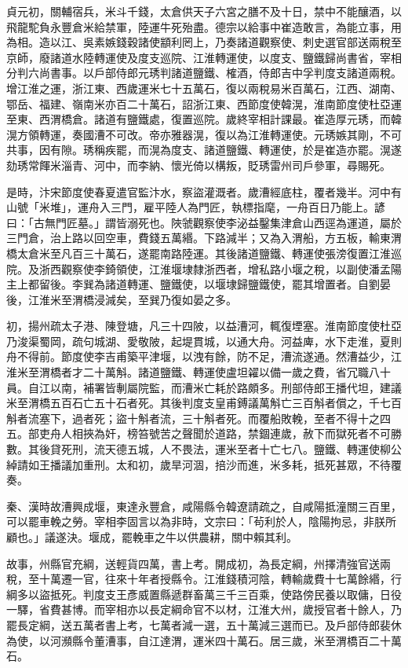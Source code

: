 \begin{pinyinscope}
 貞元初，關輔宿兵，米斗千錢，太倉供天子六宮之膳不及十日，禁中不能釀酒，以飛龍駝負永豐倉米給禁軍，陸運牛死殆盡。德宗以給事中崔造敢言，為能立事，用為相。造以江、吳素嫉錢穀諸使顓利罔上，乃奏諸道觀察使、刺史選官部送兩稅至京師，廢諸道水陸轉運使及度支巡院、江淮轉運使，以度支、鹽鐵歸尚書省，宰相分判六尚書事。以戶部侍郎元琇判諸道鹽鐵、榷酒，侍郎吉中孚判度支諸道兩稅。增江淮之運，浙江東、西歲運米七十五萬石，復以兩稅易米百萬石，江西、湖南、鄂岳、福建、嶺南米亦百二十萬石，詔浙江東、西節度使韓滉，淮南節度使杜亞運至東、西渭橋倉。諸道有鹽鐵處，復置巡院。歲終宰相計課最。崔造厚元琇，而韓滉方領轉運，奏國漕不可改。帝亦雅器滉，復以為江淮轉運使。元琇嫉其剛，不可共事，因有隙。琇稱疾罷，而滉為度支、諸道鹽鐵、轉運使，於是崔造亦罷。滉遂劾琇常餫米淄青、河中，而李納、懷光倚以構叛，貶琇雷州司戶參軍，尋賜死。



 是時，汴宋節度使春夏遣官監汴水，察盜灌溉者。歲漕經底柱，覆者幾半。河中有山號「米堆」，運舟入三門，雇平陸人為門匠，執標指麾，一舟百日乃能上。諺曰：「古無門匠墓。」謂皆溺死也。陜虢觀察使李泌益鑿集津倉山西逕為運道，屬於三門倉，治上路以回空車，費錢五萬緡。下路減半；又為入渭船，方五板，輸東渭橋太倉米至凡百三十萬石，遂罷南路陸運。其後諸道鹽鐵、轉運使張滂復置江淮巡院。及浙西觀察使李錡領使，江淮堰埭隸浙西者，增私路小堰之稅，以副使潘孟陽主上都留後。李巽為諸道轉運、鹽鐵使，以堰埭歸鹽鐵使，罷其增置者。自劉晏後，江淮米至渭橋浸減矣，至巽乃復如晏之多。



 初，揚州疏太子港、陳登塘，凡三十四陂，以益漕河，輒復堙塞。淮南節度使杜亞乃浚渠蜀岡，疏句城湖、愛敬陂，起堤貫城，以通大舟。河益庳，水下走淮，夏則舟不得前。節度使李吉甫築平津堰，以洩有餘，防不足，漕流遂通。然漕益少，江淮米至渭橋者才二十萬斛。諸道鹽鐵、轉運使盧坦糴以備一歲之費，省冗職八十員。自江以南，補署皆剸屬院監，而漕米亡耗於路頗多。刑部侍郎王播代坦，建議米至渭橋五百石亡五十石者死。其後判度支皇甫鎛議萬斛亡三百斛者償之，千七百斛者流塞下，過者死；盜十斛者流，三十斛者死。而覆船敗輓，至者不得十之四五。部吏舟人相挾為奸，榜笞號苦之聲聞於道路，禁錮連歲，赦下而獄死者不可勝數。其後貸死刑，流天德五城，人不畏法，運米至者十亡七八。鹽鐵、轉運使柳公綽請如王播議加重刑。太和初，歲旱河涸，掊沙而進，米多耗，抵死甚眾，不待覆奏。



 秦、漢時故漕興成堰，東達永豐倉，咸陽縣令韓遼請疏之，自咸陽抵潼關三百里，可以罷車輓之勞。宰相李固言以為非時，文宗曰：「茍利於人，陰陽拘忌，非朕所顧也。」議遂決。堰成，罷輓車之牛以供農耕，關中賴其利。



 故事，州縣官充綱，送輕貨四萬，書上考。開成初，為長定綱，州擇清強官送兩稅，至十萬遷一官，往來十年者授縣令。江淮錢積河陰，轉輸歲費十七萬餘緡，行綱多以盜抵死。判度支王彥威置縣遞群畜萬三千三百乘，使路傍民養以取傭，日役一驛，省費甚博。而宰相亦以長定綱命官不以材，江淮大州，歲授官者十餘人，乃罷長定綱，送五萬者書上考，七萬者減一選，五十萬減三選而已。及戶部侍郎裴休為使，以河瀕縣令董漕事，自江達渭，運米四十萬石。居三歲，米至渭橋百二十萬石。




\end{pinyinscope}
